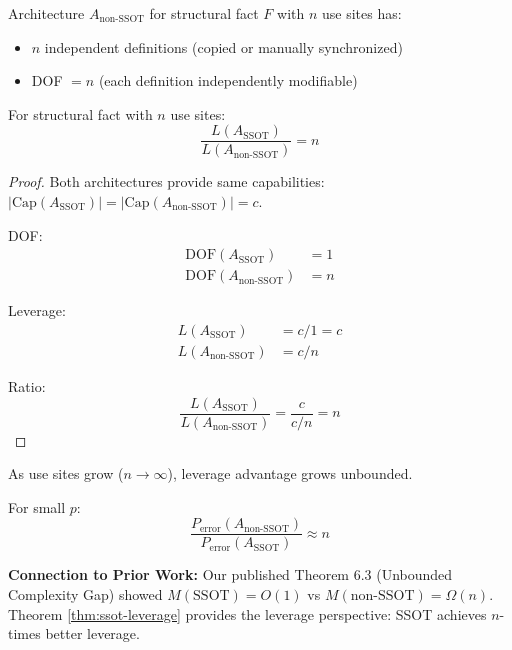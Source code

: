 \begin{definition}
Architecture $A_{\text{non-SSOT}}$ for structural fact $F$ with $n$ use sites has:
\begin{itemize}
\item $n$ independent definitions (copied or manually synchronized)
\item DOF $= n$ (each definition independently modifiable)
\end{itemize}
\end{definition}

\begin{theorem}\label{thm:ssot-leverage}
For structural fact with $n$ use sites:
\[
\frac{L(A_{\text{SSOT}})}{L(A_{\text{non-SSOT}})} = n
\]
\end{theorem}

\begin{proof}
Both architectures provide same capabilities: $|\text{Cap}(A_{\text{SSOT}})| = |\text{Cap}(A_{\text{non-SSOT}})| = c$.

DOF:
\begin{align*}
\text{DOF}(A_{\text{SSOT}}) &= 1 \\
\text{DOF}(A_{\text{non-SSOT}}) &= n
\end{align*}

Leverage:
\begin{align*}
L(A_{\text{SSOT}}) &= c/1 = c \\
L(A_{\text{non-SSOT}}) &= c/n
\end{align*}

Ratio:
\[
\frac{L(A_{\text{SSOT}})}{L(A_{\text{non-SSOT}})} = \frac{c}{c/n} = n
\]
\end{proof}

\begin{corollary}
As use sites grow ($n \to \infty$), leverage advantage grows unbounded.
\end{corollary}

\begin{corollary}
For small $p$:
\[
\frac{P_{\text{error}}(A_{\text{non-SSOT}})}{P_{\text{error}}(A_{\text{SSOT}})} \approx n
\]
\end{corollary}

\textbf{Connection to Prior Work:} Our published Theorem 6.3 (Unbounded Complexity Gap) showed $M(\text{SSOT}) = O(1)$ vs $M(\text{non-SSOT}) = \Omega(n)$. Theorem \ref{thm:ssot-leverage} provides the leverage perspective: SSOT achieves $n$-times better leverage.

